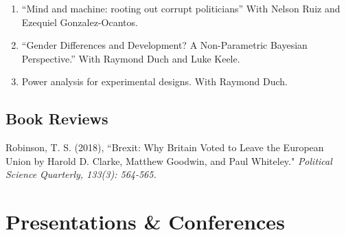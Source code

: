 \documentclass[11pt, a4paper]{article}
\begin{document}
\begin{enumerate}

\item ``Mind and machine: rooting out corrupt politicians'' With Nelson Ruiz and Ezequiel Gonzalez-Ocantos.

\item ``Gender Differences and Development? A Non-Parametric Bayesian Perspective.'' With Raymond Duch and Luke Keele. 

\item Power analysis for experimental designs.  With Raymond Duch.
\end{enumerate}

 \subsection*{Book Reviews}

  Robinson, T. S. (2018), ``Brexit: Why Britain Voted to Leave the European Union by Harold D. Clarke, Matthew Goodwin, and Paul Whiteley."\textit{ Political Science Quarterly, 133(3): 564-565.}

 \section*{Presentations \& Conferences}
\end{document}
